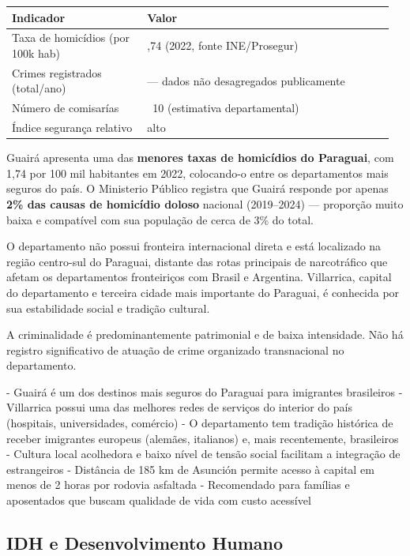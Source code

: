 {\small
\setlength{\tabcolsep}{3pt}
\renewcommand{\arraystretch}{1.12}
\begin{tabularx}{\linewidth}{>{\raggedright\arraybackslash}p{0.34\linewidth} >{\raggedright\arraybackslash}p{0.62\linewidth}}
\toprule
Indicador & Valor \\
\midrule
Taxa de homicídios (por 100k hab) & 1,74 (2022, fonte INE/Prosegur) \\
Crimes registrados (total/ano) & --- dados não desagregados publicamente \\
Número de comisarías & ~10 (estimativa departamental) \\
Índice segurança relativo & alto \\
\bottomrule
\end{tabularx}
}


Guairá apresenta uma das \textbf{menores taxas de homicídios do Paraguai}, com 1,74 por 100 mil habitantes em 2022, colocando-o entre os departamentos mais seguros do país. O Ministerio Público registra que Guairá responde por apenas \textbf{2\% das causas de homicídio doloso} nacional (2019--2024) --- proporção muito baixa e compatível com sua população de cerca de 3\% do total.

O departamento não possui fronteira internacional direta e está localizado na região centro-sul do Paraguai, distante das rotas principais de narcotráfico que afetam os departamentos fronteiriços com Brasil e Argentina. Villarrica, capital do departamento e terceira cidade mais importante do Paraguai, é conhecida por sua estabilidade social e tradição cultural.

A criminalidade é predominantemente patrimonial e de baixa intensidade. Não há registro significativo de atuação de crime organizado transnacional no departamento.


- Guairá é um dos destinos mais seguros do Paraguai para imigrantes brasileiros
- Villarrica possui uma das melhores redes de serviços do interior do país (hospitais, universidades, comércio)
- O departamento tem tradição histórica de receber imigrantes europeus (alemães, italianos) e, mais recentemente, brasileiros
- Cultura local acolhedora e baixo nível de tensão social facilitam a integração de estrangeiros
- Distância de 185 km de Asunción permite acesso à capital em menos de 2 horas por rodovia asfaltada
- Recomendado para famílias e aposentados que buscam qualidade de vida com custo acessível




\subsection{IDH e Desenvolvimento Humano}

